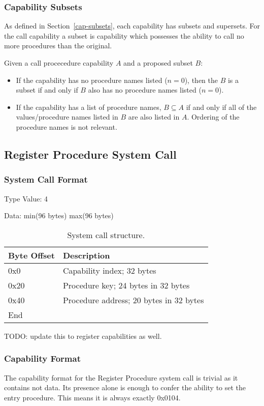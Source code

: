 \documentclass[english,a4paper]{article}
\let\oldparagraph\subsubsection
\renewcommand{\subsubsection}[1]{\oldparagraph{#1}\mbox{}}
\begin{document}
\subsubsection{Capability Subsets}
As defined in Section~\ref{cap-subsets}, each capability has subsets and
supersets. For the call capability a subset is capability which possesses the
ability to call no more procedures than the original.

Given a call procecedure capability $A$ and a proposed subset $B$:
\begin{itemize}
  \item If the capability has no procedure names listed ($n=0$), then the $B$ is
  a subset if and only if $B$ also has no procedure names listed ($n=0$).
  \item If the capability has a list of procedure names, $B \subseteq A$ if and
  only if all of the values/procedure names listed in $B$ are also listed in
  $A$. Ordering of the procedure names is not relevant.
\end{itemize}

\subsection{Register Procedure System Call}

\subsubsection{System Call Format}
Type Value: 4

Data: min(96 bytes) max(96 bytes)

\begin{table}[H]
  \caption{System call structure.}
  \centering{}%
  \begin{tabular}{l|p{}}
    \hline
    Byte Offset & Description\tabularnewline
    \hline
    \hline
    0x0 & Capability index; 32 bytes \tabularnewline
    0x20 & Procedure key; 24 bytes in 32 bytes \tabularnewline
    0x40 & Procedure address; 20 bytes in 32 bytes \tabularnewline
    \hline
    End &  \tabularnewline
    \hline
  \end{tabular}
\end{table}
TODO: update this to register capabilities as well.

\subsubsection{Capability Format}
The capability format for the Register Procedure system call is trivial as it
contains not data. Its presence alone is enough to confer the ability to set the
entry procedure. This means it is always exactly 0x0104.
\end{document}
